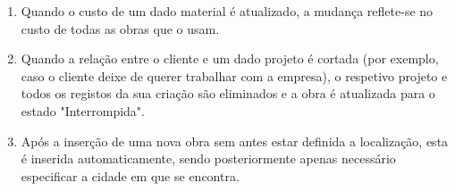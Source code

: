 \documentclass{report}
\begin{document}
		\begin{enumerate}
			\item Quando o custo de um dado material é atualizado, a mudança reflete-se no 
			custo de todas as obras que o usam.
			\item Quando a relação entre o cliente e um dado projeto é cortada (por exemplo,
			caso o cliente deixe de querer trabalhar com a empresa), o respetivo projeto e
			todos os registos da sua criação são eliminados e a obra é atualizada para o 
			estado "Interrompida".
			\item Após a inserção de uma nova obra sem antes estar definida a localização,
			esta é inserida automaticamente, sendo posteriormente apenas necessário 
			especificar a cidade em que se encontra.
		\end{enumerate}
					
		
\end{document}
